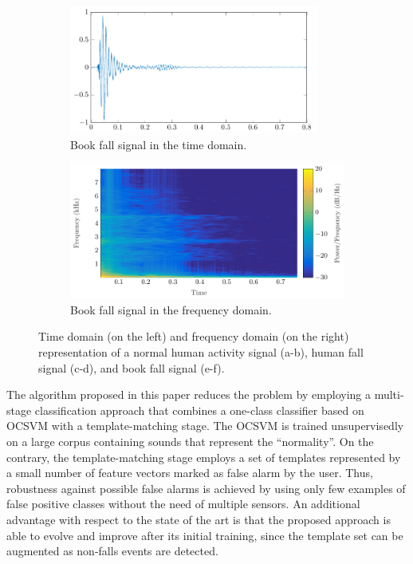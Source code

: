 \begin{figure}[htbp!]
	\begin{subfigure}[ht]{0.5\columnwidth}
		\centering
		\includegraphics[width=0.9\textwidth]{img/cin/book_time_.pdf}
		\caption{Book fall signal in the time domain.}\label{fig:time_bf}
	\end{subfigure}%
	\begin{subfigure}[ht]{0.5\columnwidth}
		\centering
		\includegraphics[width=\textwidth]{img/cin/book_freq_.pdf}
		\caption{Book fall signal in the frequency domain.}\label{fig:spec_bf}
	\end{subfigure}
	\caption{Time domain (on the left) and frequency domain (on the right) representation of a normal human activity signal (a-b), human fall signal (c-d), and book fall signal (e-f).}\label{fig:waveforms}
\end{figure}

The algorithm proposed in this paper reduces the problem by employing a multi-stage classification approach that combines a one-class classifier based on OCSVM with a template-matching stage. The OCSVM is trained unsupervisedly on a large corpus containing sounds that represent the ``normality''. On the contrary, the template-matching stage employs a set of templates represented by a small number of feature vectors marked as false alarm by the user. Thus, robustness against possible false alarms is achieved by using only few examples of false positive classes without the need of multiple sensors. An additional advantage with respect to the state of the art is that the proposed approach is able to evolve and improve after its initial training, since the template set can be augmented as non-falls events are detected.

